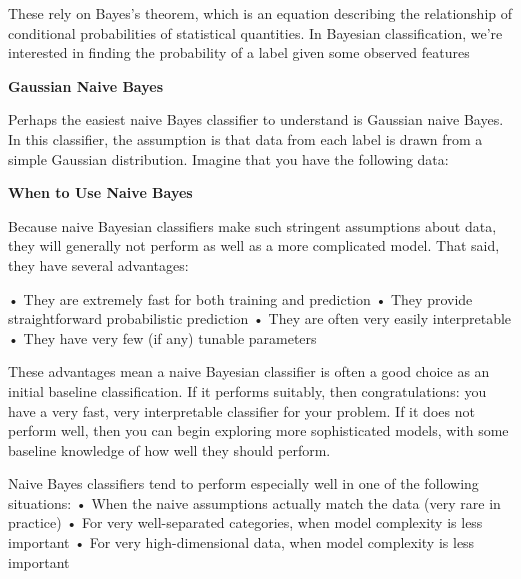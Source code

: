 \documentclass[
]{book}
\begin{document}
These rely on Bayes's theorem, which is an equation describing the relationship of conditional probabilities of statistical quantities. In Bayesian classification, we're interested in finding the probability of a label given some observed features

\textbf{Gaussian Naive Bayes}

Perhaps the easiest naive Bayes classifier to understand is Gaussian naive Bayes. In this classifier, the assumption is that data from each label is drawn from a simple Gaussian distribution. Imagine that you have the following data:

\textbf{When to Use Naive Bayes}

Because naive Bayesian classifiers make such stringent assumptions about data, they will generally not perform as well as a more complicated model. That said, they have several advantages:

• They are extremely fast for both training and prediction
• They provide straightforward probabilistic prediction
• They are often very easily interpretable
• They have very few (if any) tunable parameters

These advantages mean a naive Bayesian classifier is often a good choice as an initial baseline classification. If it performs suitably, then congratulations: you have a very fast, very interpretable classifier for your problem. If it does not perform well, then you can begin exploring more sophisticated models, with some baseline knowledge of how well they should perform.

Naive Bayes classifiers tend to perform especially well in one of the following situations:
• When the naive assumptions actually match the data (very rare in practice)
• For very well-separated categories, when model complexity is less important
• For very high-dimensional data, when model complexity is less important

  
\end{document}
